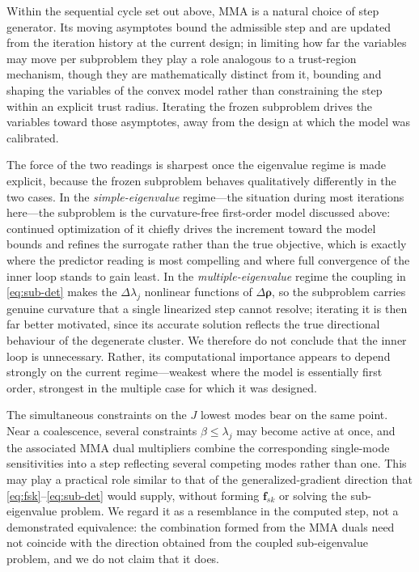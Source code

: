 \documentclass[11pt]{article}
\newcommand{\rhov}{\bm{\rho}}
\newcommand{\fv}{\mathbf{f}}
\begin{document}
Within the sequential cycle set out above, MMA is a natural choice of step
generator. Its moving asymptotes bound the admissible step and are updated
from the iteration history at the current design; in limiting how far the
variables may move per subproblem they play a role analogous to a
trust-region mechanism, though they are mathematically distinct from it,
bounding and shaping the variables of the convex model rather than
constraining the step within an explicit trust radius. Iterating the frozen
subproblem drives the variables toward those asymptotes, away from the
design at which the model was calibrated.

The force of the two readings is sharpest once the eigenvalue regime is made
explicit, because the frozen subproblem behaves qualitatively differently in
the two cases. In the \emph{simple-eigenvalue} regime---the situation during
most iterations here---the subproblem is the curvature-free first-order
model discussed above: continued optimization of it chiefly drives the
increment toward the model bounds and refines the surrogate rather than the
true objective, which is exactly where the predictor reading is most
compelling and where full convergence of the inner loop stands to gain
least. In the \emph{multiple-eigenvalue} regime the coupling in
\eqref{eq:sub-det} makes the $\Delta\lambda_j$ nonlinear functions of
$\Delta\rhov$, so the subproblem carries genuine curvature that a single
linearized step cannot resolve; iterating it is then far better motivated,
since its accurate solution reflects the true directional behaviour of the
degenerate cluster. We therefore do not conclude that the inner loop is
unnecessary. Rather, its computational importance appears to depend strongly
on the current regime---weakest where the model is essentially first order,
strongest in the multiple case for which it was designed.

The simultaneous constraints on the $J$ lowest modes bear on the same
point. Near a coalescence, several constraints $\beta\le\lambda_j$ may
become active at once, and the associated MMA dual multipliers combine the
corresponding single-mode sensitivities into a step reflecting several
competing modes rather than one. This may play a practical role similar to
that of the generalized-gradient direction that
\eqref{eq:fsk}--\eqref{eq:sub-det} would supply, without forming $\fv_{sk}$
or solving the sub-eigenvalue problem. We regard it as a resemblance in the
computed step, not a demonstrated equivalence: the combination formed from
the MMA duals need not coincide with the direction obtained from the coupled
sub-eigenvalue problem, and we do not claim that it does.
\end{document}
